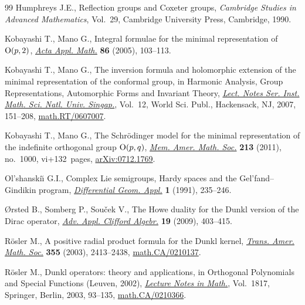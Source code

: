 \documentclass[pdftex]{sigma}
\numberwithin{equation}{section}
\numberwithin{theorem}{section}
\numberwithin{proposition}{section}
\numberwithin{lemma}{section}
\numberwithin{corollary}{section}
\numberwithin{definition}{section}
\numberwithin{example}{section}
\numberwithin{remark}{section}
\numberwithin{note}{section}
\theoremstyle{remark}
\begin{document}
\begin{thebibliography}{99}
Humphreys J.E., Ref\/lection groups and {C}oxeter groups, \textit{Cambridge
Studies in Advanced Mathematics}, Vol.~29, Cambridge University Press,
Cambridge, 1990.

Kobayashi T., Mano G., Integral formulae for the minimal representation of
{${\rm O}(p,2)$}, \href{http://dx.doi.org/10.1007/s10440-005-0464-2}{\textit{Acta Appl.
Math.}} \textbf{86} (2005), 103--113.

Kobayashi T., Mano G., The inversion formula and holomorphic extension of the
minimal representation of the conformal group, in Harmonic Analysis, Group
Representations, Automorphic Forms and Invariant Theory,
\href{http://dx.doi.org/10.1142/9789812770790_0006}{\textit{Lect.
Notes
Ser.
Inst.
Math.
Sci.
Natl.
Univ.
Singap.}}, Vol.~12, World Sci.
Publ.,
Hackensack, NJ, 2007, 151--208, \href{http://arxiv.org/abs/math.RT/0607007}{math.RT/0607007}.

Kobayashi T., Mano G., The {S}chr\"odinger model for the minimal representation
of the indef\/inite orthogonal group {${\rm O}(p,q)$},
\href{http://dx.doi.org/10.1090/S0065-9266-2011-00592-7}{\textit{Mem.
Amer.
Math.
Soc.}} \textbf{213} (2011), no.~1000, vi+132~pages,
\href{http://arxiv.org/abs/0712.1769}{arXiv:0712.1769}.

Ol'shanski{\u\i} G.I., Complex {L}ie semigroups, {H}ardy spaces and the
{G}el'fand--{G}indikin program,
\href{http://dx.doi.org/10.1016/0926-2245(91)90002-Q}{\textit{Dif\/ferential Geom.
Appl.}} \textbf{1}
(1991), 235--246.

{\O}rsted B., Somberg P., Sou{\v{c}}ek V., The {H}owe duality for the {D}unkl
version of the {D}irac operator, \href{http://dx.doi.org/10.1007/s00006-009-0166-3}{\textit{Adv.
Appl.
Clif\/ford Algebr.}}
\textbf{19} (2009), 403--415.

R{\"o}sler M., A positive radial product formula for the {D}unkl kernel,
\href{http://dx.doi.org/10.1090/S0002-9947-03-03235-5}{\textit{Trans.
Amer.
Math.
Soc.}} \textbf{355} (2003), 2413--2438,
\href{http://arxiv.org/abs/math.CA/0210137}{math.CA/0210137}.

R{\"o}sler M., Dunkl operators: theory and applications, in Orthogonal
Polynomials and Special Functions ({L}euven, 2002),
\href{http://dx.doi.org/10.1007/3-540-44945-0_3}{\textit{Lecture Notes in
Math.}}, Vol.~1817, Springer, Berlin, 2003, 93--135,
\href{http://arxiv.org/abs/math.CA/0210366}{math.CA/0210366}.


\end{thebibliography}
\end{document}
